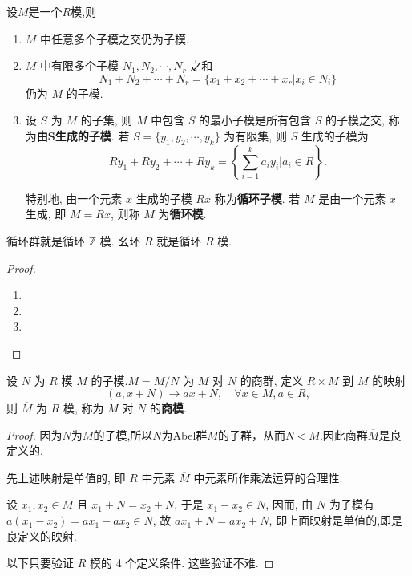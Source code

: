 \documentclass[../../main.tex]{subfiles}%
\begin{document}
\begin{theorem}
设$M$是一个$R$模,则
\begin{enumerate}[(1)]
\item \( M \) 中任意多个子模之交仍为子模.

\item \( M \) 中有限多个子模 \( N_1, N_2, \cdots, N_r \) 之和
\[
N_1 + N_2 + \cdots + N_r = \{x_1 + x_2 + \cdots + x_r | x_i \in N_i\}
\]
仍为 \( M \) 的子模.

\item 设 \( S \) 为 \( M \) 的子集, 则 \( M \) 中包含 \( S \) 的最小子模是所有包含 \( S \) 的子模之交, 称为\textbf{由\(\boldsymbol{S}\)生成的子模}. 若 \( S = \{y_1, y_2, \cdots, y_k\} \) 为有限集, 则 \( S \) 生成的子模为
\[
Ry_1 + Ry_2 + \cdots + Ry_k = \left\{ \sum_{i=1}^k a_i y_i \bigg| a_i \in R \right\}.
\]

特别地, 由一个元素 \( x \) 生成的子模 \( Rx \) 称为\textbf{循环子模}. 若 \( M \) 是由一个元素 \( x \) 生成, 即 \( M = Rx \), 则称 \( M \) 为\textbf{循环模}.
\end{enumerate}
\end{theorem}
\begin{remark}
循环群就是循环 \( \mathbb{Z} \) 模. 幺环 \( R \) 就是循环 \( R \) 模.
\end{remark}
\begin{proof}
\begin{enumerate}[(1)]
\item 

\item 

\item 
\end{enumerate}
\end{proof}

\begin{theorem}
设 \( N \) 为 \( R \) 模 \( M \) 的子模.\( \overline{M} = M/N \) 为 \( M \) 对 \( N \) 的商群, 定义 \( R \times \overline{M} \) 到 \( \overline{M} \) 的映射
\[
(a, x + N) \to ax + N, \quad \forall x \in M, a \in R,
\]
则 \( \overline{M} \) 为 \( R \) 模, 称为 \( M \) 对 \( N \) 的\textbf{商模}.
\end{theorem}
\begin{proof}
因为$N$为$M$的子模,所以$N$为Abel群$M$的子群，从而$N\lhd M$.因此商群$\overline{M}$是良定义的.

先上述映射是单值的, 即 \( R \) 中元素 \( \overline{M} \) 中元素所作乘法运算的合理性.

设 \( x_1, x_2 \in M \) 且 \( x_1 + N = x_2 + N \), 于是 \( x_1 - x_2 \in N \), 因而, 由 \( N \) 为子模有 \( a(x_1 - x_2) = ax_1 - ax_2 \in N \), 故 \( ax_1 + N = ax_2 + N \), 即上面映射是单值的,即是良定义的映射.

以下只要验证 \( R \) 模的 4 个定义条件. 这些验证不难.
\end{proof}
\end{document}
